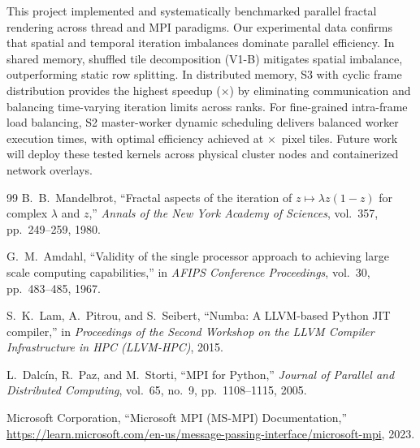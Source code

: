 \documentclass[11pt,a4paper]{article}
\begin{document}
This project implemented and systematically benchmarked parallel fractal rendering across thread and MPI paradigms. Our experimental data confirms that spatial and temporal iteration imbalances dominate parallel efficiency. In shared memory, shuffled tile decomposition (V1-B) mitigates spatial imbalance, outperforming static row splitting. In distributed memory, S3 with cyclic frame distribution provides the highest speedup (\mpiSThreeCyclicBestSpeedup$\times$) by eliminating communication and balancing time-varying iteration limits across ranks. For fine-grained intra-frame load balancing, S2 master-worker dynamic scheduling delivers balanced worker execution times, with optimal efficiency achieved at \sTwoOptimalTileSize$\times$\sTwoOptimalTileSize~pixel tiles. Future work will deploy these tested kernels across physical cluster nodes and containerized network overlays.

\clearpage

\begin{thebibliography}{99}
B.~B.~Mandelbrot, ``Fractal aspects of the iteration of $z \mapsto \lambda z(1-z)$ for complex $\lambda$ and $z$,'' \emph{Annals of the New York Academy of Sciences}, vol.~357, pp.~249--259, 1980.

G.~M.~Amdahl, ``Validity of the single processor approach to achieving large scale computing capabilities,'' in \emph{AFIPS Conference Proceedings}, vol.~30, pp.~483--485, 1967.

S.~K.~Lam, A.~Pitrou, and S.~Seibert, ``Numba: A LLVM-based Python JIT compiler,'' in \emph{Proceedings of the Second Workshop on the LLVM Compiler Infrastructure in HPC (LLVM-HPC)}, 2015.

L.~Dalcín, R.~Paz, and M.~Storti, ``MPI for Python,'' \emph{Journal of Parallel and Distributed Computing}, vol.~65, no.~9, pp.~1108--1115, 2005.

Microsoft Corporation, ``Microsoft MPI (MS-MPI) Documentation,'' \url{https://learn.microsoft.com/en-us/message-passing-interface/microsoft-mpi}, 2023.
\end{thebibliography}

\clearpage

\appendix
\end{document}
